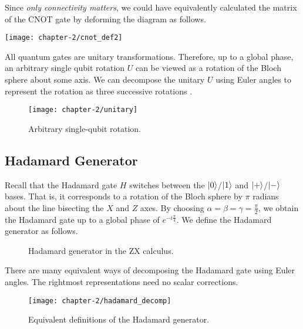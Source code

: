 Since \textit{only connectivity matters}, we could have equivalently calculated the matrix of the CNOT gate by deforming the diagram as follows.

\begin{center}
    \texttt{[image: chapter-2/cnot\_def2]}
\end{center}

All quantum gates are unitary transformations. Therefore, up to a global phase, an arbitrary single qubit rotation $U$ can be viewed as a rotation of the Bloch sphere about some axis. We can decompose the unitary $U$ using Euler angles to represent the rotation as three successive rotations \cite{Wetering2020}.
\begin{figure}[H]
    \centering
    \texttt{[image: chapter-2/unitary]}
    \caption{Arbitrary single-qubit rotation.}
\end{figure}

\subsection{Hadamard Generator}

Recall that the Hadamard gate $H$ switches between the $\ket 0$/$\ket 1$ and $\ket +$/$\ket -$ bases. That is, it corresponds to a rotation of the Bloch sphere by $\pi$ radians about the line bisecting the $X$ and $Z$ axes. By choosing $\alpha = \beta = \gamma = \frac{\pi}{2}$, we obtain the Hadamard gate up to a global phase of $e^{-i\frac{\pi}{4}}$. We define the Hadamard generator as follows.

\begin{figure}[H]
    \caption{Hadamard generator in the ZX calculus.}
\end{figure}

There are many equivalent ways of decomposing the Hadamard gate using Euler angles. The rightmost representations need no scalar corrections.
\begin{figure}[H]
\centering
    \centering
    \texttt{[image: chapter-2/hadamard\_decomp]}
    \caption{Equivalent definitions of the Hadamard generator.}
\end{figure}

